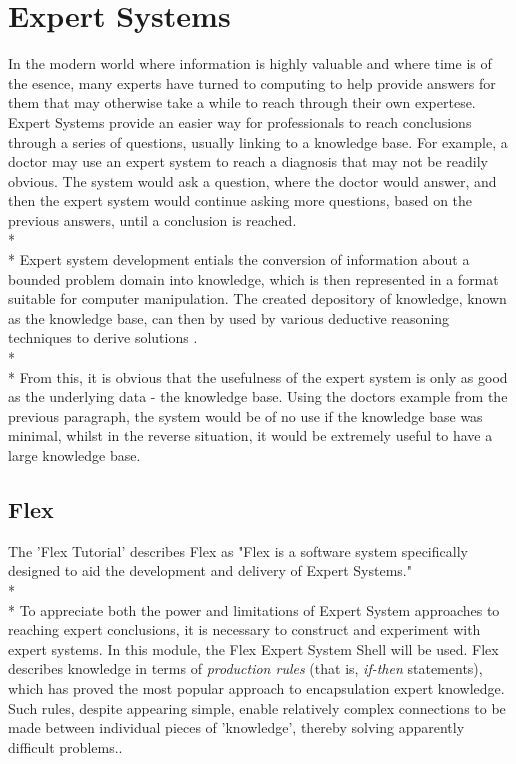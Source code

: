 \documentclass[10pt]{report}
\begin{document}
\section{Expert Systems}\label{sec:expert_systems}
In the modern world where information is highly valuable and where time is of the esence, many experts have turned to computing to help provide answers for them that may otherwise take a while to reach through their own expertese.  Expert Systems provide an easier way for professionals to reach conclusions through a series of questions, usually linking to a knowledge base.  For example, a doctor may use an expert system to reach a diagnosis that may not be readily obvious.  The system would ask a question, where the doctor would answer, and then the expert system would continue asking more questions, based on the previous answers, until a conclusion is reached.
\\*
\\*
Expert system development entials the conversion of information about a bounded problem domain into knowledge, which is then represented in a format suitable for computer manipulation.  The created depository of knowledge, known as the knowledge base, can then by used by various deductive reasoning techniques to derive solutions \citep{expertsystems98}.
\\*
\\*
From this, it is obvious that the usefulness of the expert system is only as good as the underlying data - the knowledge base.  Using the doctors example from the previous paragraph, the system would be of no use if the knowledge base was minimal, whilst in the reverse situation, it would be extremely useful to have a large knowledge base.

\subsection{Flex}\label{subsec:flex}
The 'Flex Tutorial' describes Flex as "Flex is a software system specifically designed to aid the development and delivery of Expert Systems."
\\*
\\*
To appreciate both the power and limitations of Expert System approaches to reaching expert conclusions, it is necessary to construct and experiment with expert systems.  In this module, the Flex Expert System Shell will be used.  Flex describes knowledge in terms of \textit{production rules} (that is, \textit{if-then} statements), which has proved the most popular approach to encapsulation expert knowledge.  Such rules, despite appearing simple, enable relatively complex connections to be made between individual pieces of 'knowledge', thereby solving apparently difficult problems.\citep{flexsystems09}.
\end{document}

